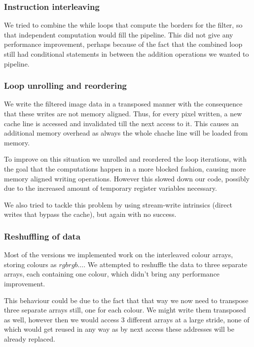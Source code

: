 \subsubsection{Instruction interleaving}

We tried to combine the while loops that compute the borders for the filter, so that independent computation would fill the pipeline. This did not give any performance improvement, perhaps because of the fact that the combined loop still had conditional statements in between the addition operations we wanted to pipeline.

\subsubsection{Loop unrolling and reordering}

We write the filtered image data in a transposed manner with the consequence that these writes are not memory aligned. Thus, for every pixel written, a new cache line is accessed and invalidated till the next access to it. This causes an additional memory overhead as always the whole chache line will be loaded from memory.

To improve on this situation we unrolled and reordered the loop iterations, with the goal that the computations happen in a more blocked fashion, causing more memory aligned writing operations. However this slowed down our code, possibly due to the increased amount of temporary register variables necessary.

We also tried to tackle this problem by using stream-write intrinsics (direct writes that bypass the cache), but again with no success.

\subsubsection{Reshuffling of data}


Most of the versions we implemented work on the interleaved colour arrays, storing colours as $rgbrgb\dots$. We attempted to reshuffle the data to three separate arrays, each containing one colour, which didn't bring any performance improvement. 

This behaviour could be due to the fact that that way we now need to transpose three separate arrays still, one for each colour. We might write them transposed as well, however then we would access 3 different arrays at a large stride, none of which would get reused in any way as by next access these addresses will be already replaced.

